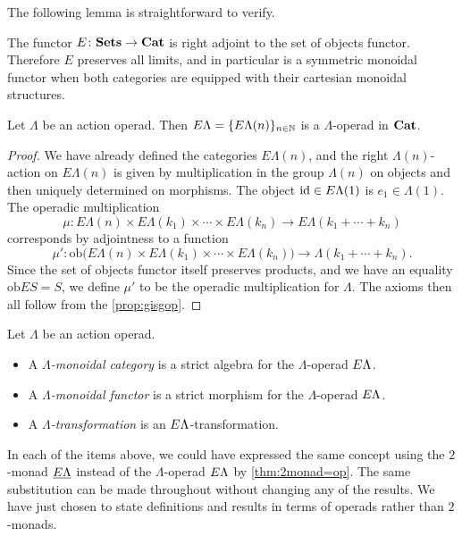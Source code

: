 The following lemma is straightforward to verify.

\begin{lem}\label{lem:symmoncor}
The functor $E \colon \mathbf{Sets} \rightarrow \mathbf{Cat}$ is right adjoint to the set of objects functor. Therefore $E$ preserves all limits, and in particular is a symmetric monoidal functor when both categories are equipped with their cartesian monoidal structures.
\end{lem}

\begin{cor}\label{cor:elambda_lambdaop}
Let $\Lambda$ be an action operad. Then $E\Lambda = \{ E\Lambda(n) \}_{n \in \mathbb{N}}$ is a $\Lambda$-operad in $\mathbf{Cat}$.
\end{cor}
\begin{proof}
We have already defined the categories $E\Lambda(n)$, and the right $\Lambda(n)$-action on $E\Lambda(n)$ is given by multiplication in the group $\Lambda(n)$ on objects and then uniquely determined on morphisms. The object $\textrm{id} \in E\Lambda(1)$ is $e_1 \in \Lambda(1)$. The operadic multiplication
\[
\mu \colon E\Lambda(n) \times E\Lambda(k_{1}) \times \cdots \times E\Lambda(k_{n}) \rightarrow E\Lambda(k_{1} + \cdots + k_{n})
\]
corresponds by adjointness to a function
\[
\mu' \colon \textrm{ob}\big( E\Lambda(n) \times E\Lambda(k_{1}) \times \cdots \times E\Lambda(k_{n}) \big) \to \Lambda(k_{1} + \cdots + k_{n}).
\]
Since the set of objects functor itself preserves products, and we have an equality $\textrm{ob}ES = S$, we define $\mu'$ to be the operadic multiplication for $\Lambda$. The axioms then all follow from the \cref{prop:gisgop}.
\end{proof}

\begin{Defi}\label{Defi:lmc}
Let $\Lambda$ be an action operad.
\begin{itemize}
\item A \emph{$\Lambda$-monoidal category} is a strict algebra for the $\Lambda$-operad $E\Lambda$. 
\item A \emph{$\Lambda$-monoidal functor} is a strict morphism for the $\Lambda$-operad $E\Lambda$. 
\item A \emph{$\Lambda$-transformation} is an $E\Lambda$-transformation.
\end{itemize}
\end{Defi}

\begin{rem}\label{rem:elambda=el}
In each of the items above, we could have expressed the same concept using the $2$-monad $\underline{E\Lambda}$ instead of the $\Lambda$-operad $E\Lambda$ by \cref{thm:2monad=op}.
The same substitution can be made throughout without changing any of the results.
We have just chosen to state definitions and results in terms of operads rather than $2$-monads.
\end{rem}

